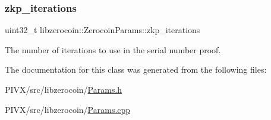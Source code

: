 \subsubsection{\texorpdfstring{zkp\+\_\+iterations}{zkp\_iterations}}
{\footnotesize\ttfamily uint32\+\_\+t libzerocoin\+::\+Zerocoin\+Params\+::zkp\+\_\+iterations}

The number of iterations to use in the serial number proof. 

The documentation for this class was generated from the following files\+:\begin{DoxyCompactItemize}
\item 
P\+I\+V\+X/src/libzerocoin/\mbox{\hyperlink{_params_8h}{Params.\+h}}\item 
P\+I\+V\+X/src/libzerocoin/\mbox{\hyperlink{_params_8cpp}{Params.\+cpp}}\end{DoxyCompactItemize}

